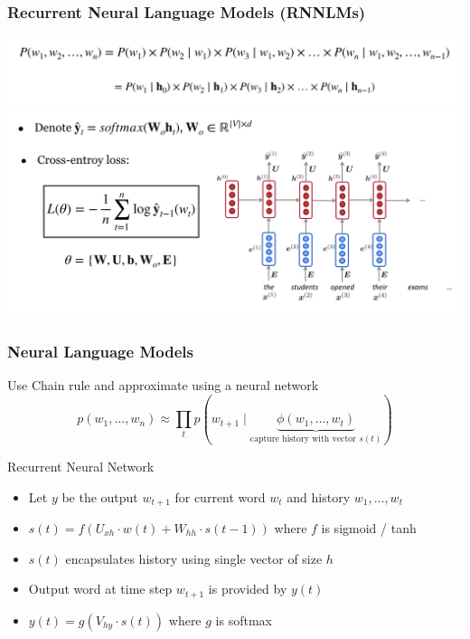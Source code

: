 \begin{frame}
\frametitle{Recurrent Neural Language Models (RNNLMs)}
\centering
\includegraphics[scale=0.175]{figures/nlm/rnnlm-p.png}
\pause
\includegraphics[scale=0.175]{figures/nlm/rnnlm.png}
\end{frame}

\begin{frame}
\frametitle{Neural Language Models}
\begin{block}{Use Chain rule and approximate using a neural network}
\[ p(w_1, \ldots, w_n) \approx \prod_{t} p(w_{t+1} \mid \underbrace{\phi(w_1, \ldots, w_t)}_{\text{capture history with vector $s(t)$}}) \]
\end{block}
\pause
\begin{block}{Recurrent Neural Network}
\begin{itemize}[<+->]
	\item Let $y$ be the output $w_{t+1}$ for current word $w_t$ and history $w_1, \ldots, w_t$
	\item $s(t) = f(U_{xh} \cdot w(t) + W_{hh} \cdot s(t-1))$ where $f$ is sigmoid / tanh
	\item $s(t)$ encapsulates history using single vector of size $h$
	\item Output word at time step $w_{t+1}$ is provided by $y(t)$
	\item $y(t) = g(V_{hy} \cdot s(t))$ where $g$ is softmax
\end{itemize}
\end{block}
\end{frame}

